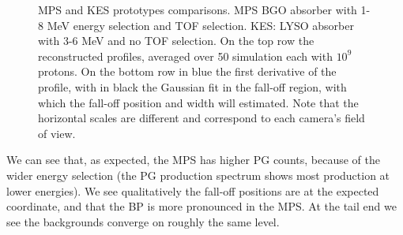 \documentclass[a4paper,english,12pt]{article}
\begin{document}
\begin{figure}[!htp]
  \centering
  \quad
  \caption{\label{fig:PGprofileProtoComp}MPS and KES prototypes comparisons. MPS BGO absorber with 1-8 MeV energy selection and TOF selection. KES: LYSO absorber with 3-6 MeV and no TOF selection. On the top row the reconstructed profiles, averaged over 50 simulation each with $10^9$ protons. On the bottom row in blue the first derivative of the profile, with in black the Gaussian fit in the fall-off region, with which the fall-off position and width will estimated. Note that the horizontal scales are different and correspond to each camera's field of view.}
\end{figure}

We can see that, as expected, the MPS has higher PG counts, because of the wider energy selection (the PG production spectrum shows most production at lower energies). We see qualitatively the fall-off positions are at the expected coordinate, and that the BP is more pronounced in the MPS. At the tail end we see the backgrounds converge on roughly the same level.
\end{document}
